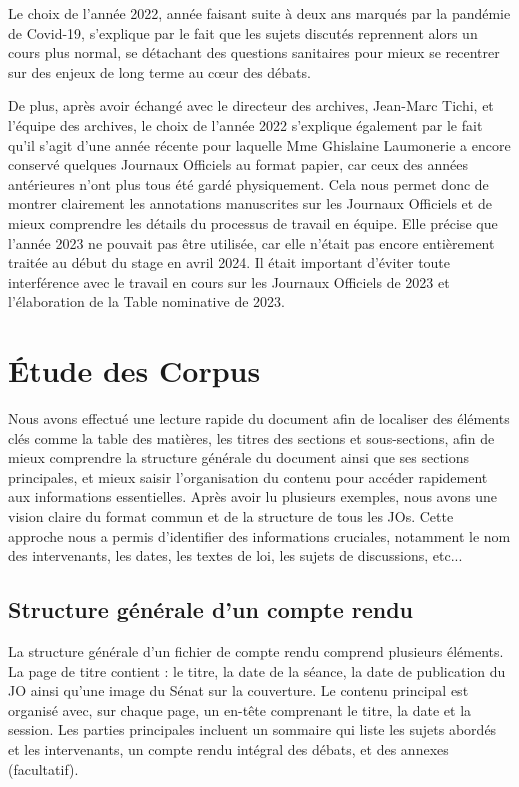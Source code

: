 Le choix de l'année 2022, année faisant suite à deux ans marqués par la pandémie de Covid-19, s'explique par le fait que les sujets discutés reprennent alors un cours plus normal, se détachant des questions sanitaires pour mieux se recentrer sur des enjeux de long terme au cœur des débats.

De plus, après avoir échangé avec le directeur des archives, Jean-Marc Tichi, et l'équipe des archives, le choix de l'année 2022 s'explique également par le fait qu'il s'agit d'une année récente pour laquelle Mme Ghislaine Laumonerie a encore conservé quelques Journaux Officiels au format papier, car ceux des années antérieures n'ont plus tous été gardé physiquement. Cela nous permet donc de montrer clairement les annotations manuscrites sur les Journaux Officiels et de mieux comprendre les détails du processus de travail en équipe. Elle précise que l'année 2023 ne pouvait pas être utilisée, car elle n'était pas encore entièrement traitée au début du stage en avril 2024. Il était important d'éviter toute interférence avec le travail en cours sur les Journaux Officiels de 2023 et l'élaboration de la Table nominative de 2023.


\section{Étude des Corpus}

Nous avons effectué une lecture rapide du document afin de localiser des éléments clés comme la table des matières, les titres des sections et sous-sections, afin de mieux comprendre la structure générale du document ainsi que ses sections principales, et mieux saisir l'organisation du contenu pour accéder rapidement aux informations essentielles. Après avoir lu plusieurs exemples, nous avons une vision claire du format commun et de la structure de tous les JOs. Cette approche nous a permis d'identifier des informations cruciales, notamment le nom des intervenants, les dates, les textes de loi, les sujets de discussions, etc...

\subsection{Structure générale d'un compte rendu}
La structure générale d'un fichier de compte rendu comprend plusieurs éléments. La page de titre contient : le titre, la date de la séance, la date de publication du \gls{JO} ainsi qu'une image du Sénat sur la couverture. Le contenu principal est organisé avec, sur chaque page, un en-tête comprenant le titre, la date et la session. Les parties principales incluent un sommaire qui liste les sujets abordés et les intervenants, un compte rendu intégral des débats, et des annexes (facultatif).

